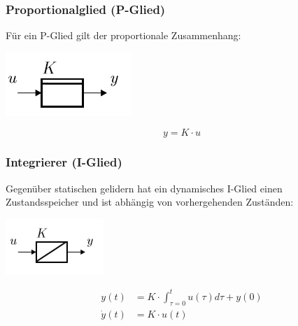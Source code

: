 \subsubsection{Proportionalglied (P-Glied)}
Für ein P-Glied gilt der proportionale Zusammenhang:

\begin{center}
	\begin{minipage}{0.10\textwidth}
		\includegraphics[width=\linewidth,keepaspectratio=true]{Images/pglied}
	\end{minipage}%
	\begin{minipage}{0.3\textwidth}
		\[y = K \cdot u\]
	\end{minipage}
\end{center}


\subsubsection{Integrierer (I-Glied)}
Gegenüber statischen gelidern hat ein dynamisches I-Glied einen Zustandsspeicher und ist abhängig von vorhergehenden Zuständen:

\begin{center}
	\begin{minipage}{0.10\textwidth}
		\includegraphics[width=\linewidth,keepaspectratio=true]{Images/iglied}
	\end{minipage}%
	\begin{minipage}{0.3\textwidth}
		\begin{align*}
			y(t) &= K \cdot \int_{\tau=0}^{t}u(\tau)d\tau + y(0) \\
			\dot{y}(t) &= K \cdot u(t)
		\end{align*}
	\end{minipage}
\end{center}

